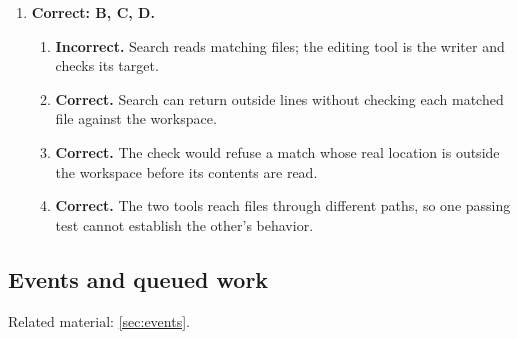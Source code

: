 \begin{enumerate}[start=31,itemsep=0.7\baselineskip]
\item[{\hyperref[exercise:40]{40.}}] \begin{minipage}[t]{\linewidth}
\textbf{Correct: B, C, D.}
\begin{enumerate}[label=\textnormal{(\Alph*)},leftmargin=*,itemsep=0pt]
\item \textbf{Incorrect.} Search reads matching files; the editing tool is the writer and checks its target.
\item \textbf{Correct.} Search can return outside lines without checking each matched file against the workspace.
\item \textbf{Correct.} The check would refuse a match whose real location is outside the workspace before its contents are read.
\item \textbf{Correct.} The two tools reach files through different paths, so one passing test cannot establish the other's behavior.
\end{enumerate}
\end{minipage}

\end{enumerate}

\subsection{Events and queued work}
\noindent Related material: \cref{sec:events}.

